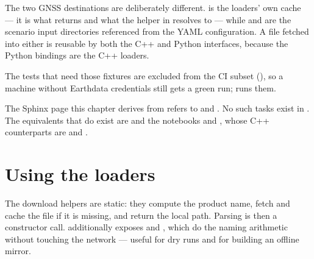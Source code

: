 The two GNSS destinations are deliberately different.
 is the loaders' own cache --- it is what
 returns and what the 
helper in  resolves to --- while
 and  are the
scenario input directories referenced from the YAML configuration. A file fetched into either is reusable
by both the C++ and Python interfaces, because the Python bindings are the C++
loaders.

The tests that need those fixtures are excluded from the CI subset
(), so a machine without Earthdata credentials
still gets a green run;  runs them.

\begin{lupntwarning}
The Sphinx page this chapter derives from refers to
 and
. No such tasks exist in
. The equivalents that do exist are
 and the notebooks
 and
, whose C++ counterparts
are  and
.
\end{lupntwarning}

\section{Using the loaders}
\label{sec:sp3-api}

The download helpers are static: they compute the product name, fetch and
cache the file if it is missing, and return the local path. Parsing is then a
constructor call.  additionally exposes
 and , which do the naming arithmetic
without touching the network --- useful for dry runs and for building an
offline mirror.

